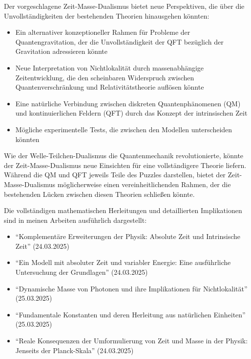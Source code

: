 \documentclass[a4paper,12pt]{article}
\begin{document}
	Der vorgeschlagene Zeit-Masse-Dualismus bietet neue Perspektiven, die über die Unvollständigkeiten der bestehenden Theorien hinausgehen könnten:
	
	\begin{itemize}
		\item Ein alternativer konzeptioneller Rahmen für Probleme der Quantengravitation, der die Unvollständigkeit der QFT bezüglich der Gravitation adressieren könnte
		\item Neue Interpretation von Nichtlokalität durch massenabhängige Zeitentwicklung, die den scheinbaren Widerspruch zwischen Quantenverschränkung und Relativitätstheorie auflösen könnte
		\item Eine natürliche Verbindung zwischen diskreten Quantenphänomenen (QM) und kontinuierlichen Feldern (QFT) durch das Konzept der intrinsischen Zeit
		\item Mögliche experimentelle Tests, die zwischen den Modellen unterscheiden könnten
	\end{itemize}
	
	Wie der Welle-Teilchen-Dualismus die Quantenmechanik revolutionierte, könnte der Zeit-Masse-Dualismus neue Einsichten für eine vollständigere Theorie liefern. Während die QM und QFT jeweils Teile des Puzzles darstellen, bietet der Zeit-Masse-Dualismus möglicherweise einen vereinheitlichenden Rahmen, der die bestehenden Lücken zwischen diesen Theorien schließen könnte.
	
	Die vollständigen mathematischen Herleitungen und detaillierten Implikationen sind in meinen Arbeiten ausführlich dargestellt:
	\begin{itemize}
		\item ``Komplementäre Erweiterungen der Physik: Absolute Zeit und Intrinsische Zeit'' (24.03.2025)
		\item ``Ein Modell mit absoluter Zeit und variabler Energie: Eine ausführliche Untersuchung der Grundlagen'' (24.03.2025)
		\item ``Dynamische Masse von Photonen und ihre Implikationen für Nichtlokalität'' (25.03.2025)
		\item ``Fundamentale Konstanten und deren Herleitung aus natürlichen Einheiten'' (25.03.2025)
		\item ``Reale Konsequenzen der Umformulierung von Zeit und Masse in der Physik: Jenseits der Planck-Skala'' (24.03.2025)
	\end{itemize}
	
\end{document}
